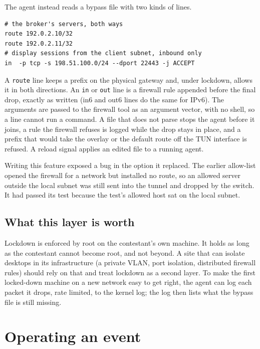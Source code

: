 \documentclass[11pt,a4paper]{article}
\begin{document}
The agent instead reads a bypass file with two kinds of lines.

\begin{small}\begin{verbatim}
# the broker's servers, both ways
route 192.0.2.10/32
route 192.0.2.11/32
# display sessions from the client subnet, inbound only
in  -p tcp -s 198.51.100.0/24 --dport 22443 -j ACCEPT
\end{verbatim}\end{small}

A \texttt{route} line keeps a prefix on the physical gateway and, under lockdown, allows it in both directions. An \texttt{in} or \texttt{out} line is a firewall rule appended before the final drop, exactly as written (in6 and out6 lines do the same for IPv6). The arguments are passed to the firewall tool as an argument vector, with no shell, so a line cannot run a command. A file that does not parse stops the agent before it joins, a rule the firewall refuses is logged while the drop stays in place, and a prefix that would take the overlay or the default route off the TUN interface is refused. A reload signal applies an edited file to a running agent.

Writing this feature exposed a bug in the option it replaced. The earlier allow-list opened the firewall for a network but installed no route, so an allowed server outside the local subnet was still sent into the tunnel and dropped by the switch. It had passed its test because the test's allowed host sat on the local subnet.

\hypertarget{what-this-layer-is-worth}{%
\subsection{What this layer is worth}\label{what-this-layer-is-worth}}

Lockdown is enforced by root on the contestant's own machine. It holds as long as the contestant cannot become root, and not beyond. A site that can isolate desktops in its infrastructure (a private VLAN, port isolation, distributed firewall rules) should rely on that and treat lockdown as a second layer. To make the first locked-down machine on a new network easy to get right, the agent can log each packet it drops, rate limited, to the kernel log; the log then lists what the bypass file is still missing.

\hypertarget{operating-an-event}{%
\section{Operating an event}\label{operating-an-event}}
\end{document}
